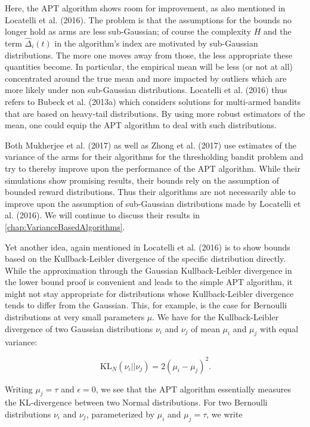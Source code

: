 \documentclass[11pt,]{article}
\newcommand{\KL}{\,\text{KL}}
\begin{document}
Here, the APT algorithm shows room for improvement, as also mentioned in
Locatelli et al. (2016). The problem is that the assumptions for the
bounds no longer hold as arms are less sub-Gaussian; of course the
complexity \(H\) and the term \(\hat{\Delta}_i(t)\) in the algorithm's
index are motivated by sub-Gaussian distributions. The more one moves
away from those, the less appropriate these quantities become. In
particular, the empirical mean will be less (or not at all) concentrated
around the true mean and more impacted by outliers which are more likely
under non sub-Gaussian distributions. Locatelli et al. (2016) thus
refers to Bubeck et al. (2013a) which considers solutions for
multi-armed bandits that are based on heavy-tail distributions. By using
more robust estimators of the mean, one could equip the APT algorithm to
deal with such distributions.

Both Mukherjee et al. (2017) as well as Zhong et al. (2017) use
estimates of the variance of the arms for their algorithms for the
thresholding bandit problem and try to thereby improve upon the
performance of the APT algorithm. While their simulations show promising
results, their bounds rely on the assumption of bounded reward
distributions. Thus their algorithms are not necessarily able to improve
upon the assumption of sub-Gaussian distributions made by Locatelli et
al. (2016). We will continue to discuss their results in
\autoref{chap:VarianceBasedAlgorithms}.

Yet another idea, again mentioned in Locatelli et al. (2016) is to show
bounds based on the Kullback-Leibler divergence of the specific
distribution directly. While the approximation through the Gaussian
Kullback-Leibler divergence in the lower bound proof is convenient and
leads to the simple APT algorithm, it might not stay appropriate for
distributions whose Kullback-Leibler divergence tends to differ from the
Gaussian. This, for example, is the case for Bernoulli distributions at
very small parameters \(\mu\). We have for the Kullback-Leibler
divergence of two Gaussian distributions \(\nu_i\) and \(\nu_j\) of mean
\(\mu_i\) and \(\mu_j\) with equal variance:

\[
\KL_{N}(\nu_i || \nu_j) = 2(\mu_i - \mu_j)^2.
\]

Writing \(\mu_j = \tau\) and \(\epsilon = 0\), we see that the APT
algorithm essentially measures the KL-divergence between two Normal
distributions. For two Bernoulli distributions \(\nu_i\) and \(\nu_j\),
parameterized by \(\mu_i\) and \(\mu_j=\tau\), we write
\end{document}
